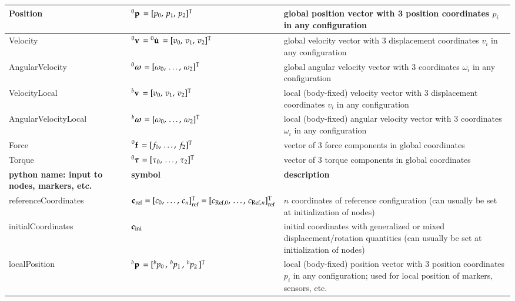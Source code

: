 \documentclass[11pt,a4paper]{book} %
\newcommand{\cIni}{_\mathrm{ini}} %
\newcommand{\cRef}{_\mathrm{ref}} %
\begin{document}
\begin{center}
\begin{longtable}{| p{5cm} | p{5cm} | p{6cm} |}
    Position & $\prescript{0}{}{\mathbf{p}}\, = [p_0,\, p_1,\, p_2]^\mathrm{T}$ & global position vector with 3 position coordinates $p_i$ in any configuration\\ \hline
    Velocity & $\prescript{0}{}{\mathbf{v}}\, = \prescript{0}{}{\dot {\mathbf{u}}}\, = [v_0,\, v_1,\, v_2]^\mathrm{T}$ & global velocity vector with 3 displacement coordinates $v_i$ in any configuration\\ \hline
    AngularVelocity & $\prescript{0}{}{\mbox{\boldmath $\omega$ \unboldmath}\!\!}\, = [\omega_0,\, \ldots,\, \omega_2]^\mathrm{T}$ & global angular velocity vector with $3$ coordinates $\omega_i$ in any configuration\\ \hline
%
    VelocityLocal & $\prescript{b}{}{\mathbf{v}}\, = [v_0,\, v_1,\, v_2]^\mathrm{T}$ & local (body-fixed) velocity vector with 3 displacement coordinates $v_i$ in any configuration\\ \hline
    AngularVelocityLocal & $\prescript{b}{}{\mbox{\boldmath $\omega$ \unboldmath}\!\!}\, = [\omega_0,\, \ldots,\, \omega_2]^\mathrm{T}$ & local (body-fixed) angular velocity vector with $3$ coordinates $\omega_i$ in any configuration\\ \hline
    Force & $\prescript{0}{}{\mathbf{f}}\, = [f_0,\, \ldots,\, f_2]^\mathrm{T}$ & vector of $3$ force components in global coordinates\\ \hline
    Torque & $\prescript{0}{}{\mbox{\boldmath $\tau$ \unboldmath}\!\!}\, = [\tau_0,\, \ldots,\, \tau_2]^\mathrm{T}$ & vector of $3$ torque components in global coordinates\\ \hline
		\hline %
    \bf python name: input to nodes, markers, etc. & \bf symbol & \bf description \\ \hline
    referenceCoordinates & $\cv\cRef = [c_0,\, \ldots,\, c_n]\cRef\tp = [c_{\mathrm{Ref},0},\, \ldots,\, c_{\mathrm{Ref},n}]\cRef\tp$ & $n$ coordinates of reference configuration (can usually be set at initialization of nodes)\\ \hline
    initialCoordinates & $\cv\cIni$ & initial coordinates with generalized or mixed displacement/rotation quantities (can usually be set at initialization of nodes)  \\ \hline
    localPosition & $\prescript{b}{}{\mathbf{p}}\, = [\prescript{b}{}{p}_{0}\,,\, \prescript{b}{}{p}_{1}\,,\, \prescript{b}{}{p}_{2}\,]^\mathrm{T}$ & local (body-fixed) position vector with 3 position coordinates $p_i$ in any configuration; used for local position of markers, sensors, etc.\\ \hline
	  \end{longtable}
	\end{center}
%
\end{document}
